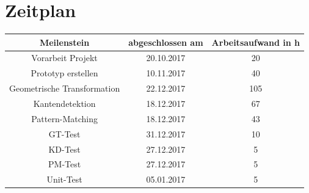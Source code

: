 \documentclass[deutsch]{scrartcl}
\begin{document}
\section{Zeitplan}
\begin{table}[h!]
	\centering
		\begin{tabular}{|c|c|c|}
		\hline
		Meilenstein & abgeschlossen am & Arbeitsaufwand in h\\
		\hline
		Vorarbeit Projekt & 20.10.2017 & 20\\
		Prototyp erstellen& 10.11.2017 & 40\\
		Geometrische Transformation& 22.12.2017 & 105 \\
		Kantendetektion& 18.12.2017 & 67 \\
		Pattern-Matching & 18.12.2017 & 43\\
		GT-Test & 31.12.2017 & 10 \\
		KD-Test & 27.12.2017 & 5 \\
		PM-Test & 27.12.2017 & 5 \\
		Unit-Test & 05.01.2017 & 5 \\
		\hline
		\end{tabular}
\end{table}
\nocite{*}

{}
\end{document}

